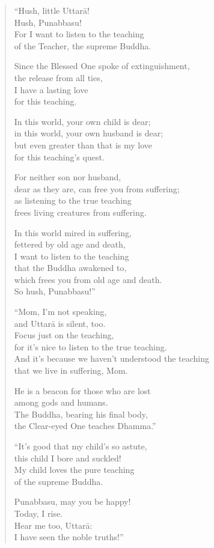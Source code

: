\documentclass[12pt,openany]{book}%
\begin{document}
\begin{verse}%
“Hush, little \textsanskrit{Uttarā}! \\
Hush, Punabbasu! \\
For I want to listen to the teaching \\
of the Teacher, the supreme Buddha. 

Since the Blessed One spoke of extinguishment, \\
the release from all ties, \\
I have a lasting love \\
for this teaching. 

In this world, your own child is dear; \\
in this world, your own husband is dear; \\
but even greater than that is my love \\
for this teaching’s quest. 

For neither son nor husband, \\
dear as they are, can free you from suffering; \\
as listening to the true teaching \\
frees living creatures from suffering. 

In this world mired in suffering, \\
fettered by old age and death, \\
I want to listen to the teaching \\
that the Buddha awakened to, \\
which frees you from old age and death. \\
So hush, Punabbasu!” 

“Mom, I’m not speaking, \\
and \textsanskrit{Uttarā} is silent, too. \\
Focus just on the teaching, \\
for it’s nice to listen to the true teaching. \\
And it’s because we haven’t understood the teaching \\
that we live in suffering, Mom. 

He is a beacon for those who are lost \\
among gods and humans. \\
The Buddha, bearing his final body, \\
the Clear-eyed One teaches Dhamma.” 

“It’s good that my child’s so astute, \\
this child I bore and suckled! \\
My child loves the pure teaching \\
of the supreme Buddha. 

Punabbasu, may you be happy! \\
Today, I rise. \\
Hear me too, \textsanskrit{Uttarā}: \\
I have seen the noble truths!” 

%
\end{verse}
\end{document}

